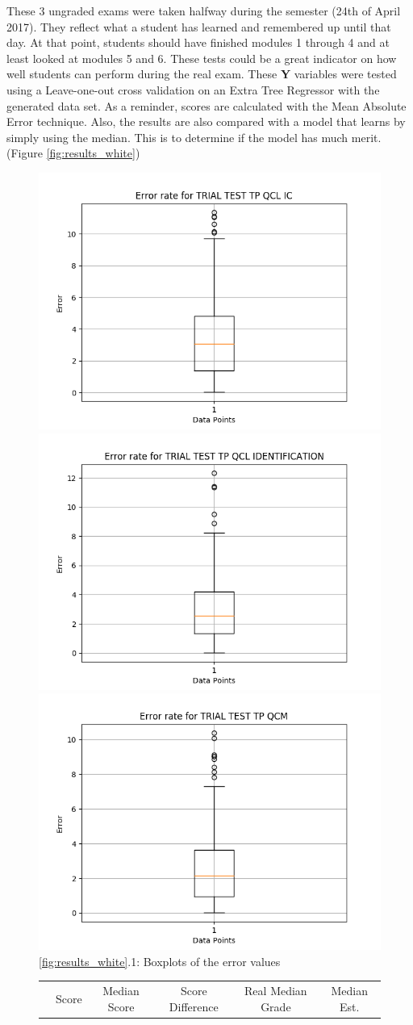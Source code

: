 \documentclass[a4paper,11pt]{report}
\numberwithin{figure}{section} %
\begin{document}
    These 3 ungraded exams were taken halfway during the semester (24th of April 2017).
    They reflect what a student has learned and remembered up until that day.
    At that point, students should have finished modules 1 through 4 and at least looked at modules 5 and 6.
    These tests could be a great indicator on how well students can perform during the real exam.
    These \textbf{Y} variables were tested using a Leave-one-out cross validation on an Extra Tree Regressor with the generated data set.
    As a reminder, scores are calculated with the Mean Absolute Error technique.
    Also, the results are also compared with a model that learns by simply using the median.
    This is to determine if the model has much merit. (Figure \ref{fig:results_white})
    \begin{figure}[H]
      \centering
  	  \includegraphics[width=.3\linewidth]{plots/cv_boxplot_TRIAL_TEST_TP_QCL_IC_2018-04-27_14_35_12.png}
  	  \includegraphics[width=.3\linewidth]{plots/cv_boxplot_TRIAL_TEST_TP_QCL_IDENTIFICATION_2018-04-27_14_31_56.png}
      \includegraphics[width=.3\linewidth]{plots/cv_boxplot_TRIAL_TEST_TP_QCM_2018-04-27_17_16_59.png}
      \\
      \ref{fig:results_white}.1: Boxplots of the error values
      \\
      \vspace{0.5cm}
      \begin{tabular}{| l | c | c | c | c | c |}
      \hline
      & \tiny{Score} & \tiny{Median Score} & \tiny{Score Difference} & \tiny{Real Median Grade} & \tiny{Median Est.
}
\end{tabular}
\end{figure}
\end{document}
